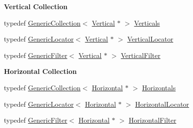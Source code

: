 \begin{Indent}\textbf{ Vertical Collection}\par
\begin{DoxyCompactItemize}
\item 
typedef \mbox{\hyperlink{classHurricane_1_1GenericCollection}{Generic\+Collection}}$<$ \mbox{\hyperlink{classHurricane_1_1Vertical}{Vertical}} $\ast$ $>$ \mbox{\hyperlink{namespaceHurricane_a146e2d3d34b4035aff422f12e85345b9}{Verticals}}
\item 
typedef \mbox{\hyperlink{classHurricane_1_1GenericLocator}{Generic\+Locator}}$<$ \mbox{\hyperlink{classHurricane_1_1Vertical}{Vertical}} $\ast$ $>$ \mbox{\hyperlink{namespaceHurricane_a0b7ececb547a716d7d509210a271aae4}{Vertical\+Locator}}
\item 
typedef \mbox{\hyperlink{classHurricane_1_1GenericFilter}{Generic\+Filter}}$<$ \mbox{\hyperlink{classHurricane_1_1Vertical}{Vertical}} $\ast$ $>$ \mbox{\hyperlink{namespaceHurricane_a3ac8462f707e425944df83c57835b13d}{Vertical\+Filter}}
\end{DoxyCompactItemize}
\end{Indent}
\begin{Indent}\textbf{ Horizontal Collection}\par
\begin{DoxyCompactItemize}
\item 
typedef \mbox{\hyperlink{classHurricane_1_1GenericCollection}{Generic\+Collection}}$<$ \mbox{\hyperlink{classHurricane_1_1Horizontal}{Horizontal}} $\ast$ $>$ \mbox{\hyperlink{namespaceHurricane_a721e644c7d97f2f66049ab062140b855}{Horizontals}}
\item 
typedef \mbox{\hyperlink{classHurricane_1_1GenericLocator}{Generic\+Locator}}$<$ \mbox{\hyperlink{classHurricane_1_1Horizontal}{Horizontal}} $\ast$ $>$ \mbox{\hyperlink{namespaceHurricane_a7f4e07165be3dfcec8786e88370bdb67}{Horizontal\+Locator}}
\item 
typedef \mbox{\hyperlink{classHurricane_1_1GenericFilter}{Generic\+Filter}}$<$ \mbox{\hyperlink{classHurricane_1_1Horizontal}{Horizontal}} $\ast$ $>$ \mbox{\hyperlink{namespaceHurricane_a56eb48037c2e1295fafe761bf179bf01}{Horizontal\+Filter}}
\end{DoxyCompactItemize}
\end{Indent}
